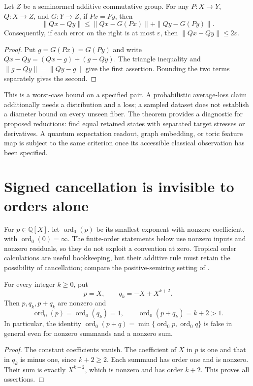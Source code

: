 \begin{proposition}
\label{prop:reduction-error-diameter}
Let $Z$ be a seminormed additive commutative group. For any
$P:X\to Y$, $Q:X\to Z$, and $G:Y\to Z$, if $Px=Py$, then
\[
 \|Qx-Qy\|\leq\|Qx-G(Px)\|+\|Qy-G(Py)\|.
\]
Consequently, if each error on the right is at most $\varepsilon$,
then $\|Qx-Qy\|\leq2\varepsilon$.
\end{proposition}
\begin{proof}
Put $g=G(Px)=G(Py)$ and write
$Qx-Qy=(Qx-g)+(g-Qy)$. The triangle inequality and
$\|g-Qy\|=\|Qy-g\|$ give the first assertion. Bounding the two terms
separately gives the second.
\end{proof}

This is a worst-case bound on a specified pair. A probabilistic average-loss
claim additionally needs a distribution and a loss; a sampled dataset does
not establish a diameter bound on every unseen fiber. The theorem provides
a diagnostic for proposed reductions: find equal retained states with
separated target stresses or derivatives. A quantum expectation readout,
graph embedding, or toric feature map is subject to the same criterion once
its accessible classical observation has been specified.

\section{Signed cancellation is invisible to orders alone}

For $p\in\mathbb Q[X]$, let $\operatorname{ord}_0(p)$ be its smallest
exponent with nonzero coefficient, with $\operatorname{ord}_0(0)=\infty$.
The finite-order statements below use nonzero inputs and nonzero residuals,
so they do not exploit a convention at zero. Tropical order calculations
are useful bookkeeping, but their additive rule must retain the possibility
of cancellation; compare the positive-semiring setting of
\citet{ReductionLitvinov2005}.

\begin{proposition}
\label{prop:reduction-signed-order}
For every integer $k\geq0$, put
\[
 p=X,\qquad q_k=-X+X^{k+2}.
\]
Then $p,q_k,p+q_k$ are nonzero and
\[
 \operatorname{ord}_0(p)=\operatorname{ord}_0(q_k)=1,
 \qquad \operatorname{ord}_0(p+q_k)=k+2>1.
\]
In particular, the identity
$\operatorname{ord}_0(p+q)=\min\{\operatorname{ord}_0p,
\operatorname{ord}_0q\}$ is false in general even for nonzero summands
and a nonzero sum.
\end{proposition}
\begin{proof}
The constant coefficients vanish. The coefficient of $X$ in $p$ is one
and that in $q_k$ is minus one, since $k+2\geq2$. Each summand has order
one and is nonzero. Their sum is exactly $X^{k+2}$, which is nonzero
and has order $k+2$. This proves all assertions.
\end{proof}

